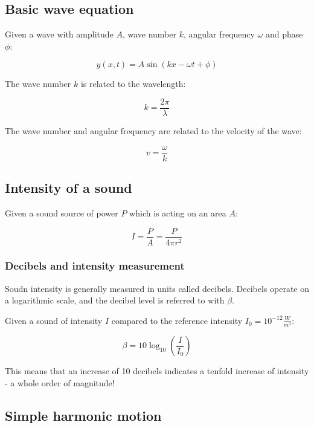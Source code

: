 \documentclass[12pt]{article}
\begin{document}
\subsection{Basic wave equation}

Given a wave with amplitude $A$, wave number $k$, angular frequency $\omega$ and phase $\phi$:

\[
\boxed{
y(x,t) = A\sin(kx - \omega t + \phi)
}
\]

The wave number $k$ is related to the wavelength:

\[
\boxed{
k = \frac{2\pi}{\lambda}
}
\]

The wave number and angular frequency are related to the velocity of the wave:

\[
\boxed{
v = \frac{\omega}{k}
}
\]


\subsection{Intensity of a sound}

Given a sound source of power $P$ which is acting on an area $A$:

\[
\boxed{
I = \frac{P}{A} = \frac{P}{4\pi r^2}
}
\]

\subsubsection{Decibels and intensity measurement}

Soudn intensity is generally measured in units called decibels.
Decibels operate on a logarithmic scale, and the decibel level is referred to with $\beta$.

Given a sound of intensity $I$ compared to the reference intensity $I_0 = 10^{-12} \frac{W}{m^2}$:

\[
\boxed{
\beta = 10\log_{10}\left(\frac{I}{I_0}\right)
}
\]

This means that an increase of 10 decibels indicates a tenfold increase of intensity - a whole order of magnitude!

\newpage

\subsection{Simple harmonic motion}
\end{document}
